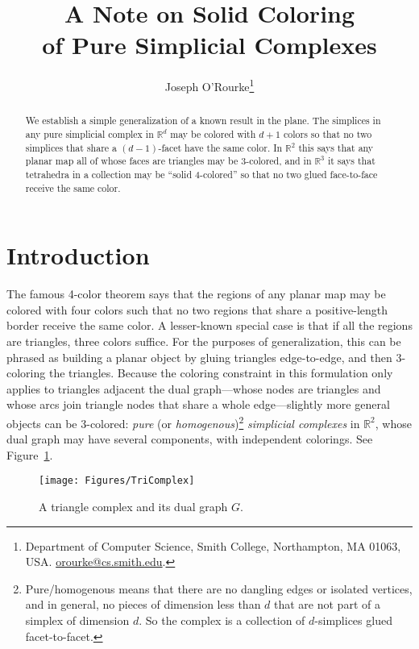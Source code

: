 \pdfoutput=1  \documentclass[]{article}
\title{A Note on Solid Coloring\\of Pure Simplicial Complexes
}
\author{Joseph O'Rourke\thanks{Department of Computer Science, Smith College, Northampton, MA
      01063, USA.
      \protect\url{orourke@cs.smith.edu}.}
}
\newcommand{\figlab}[1]{\label{fig:#1}}
\newcommand{\seclab}[1]{\label{sec:#1}}
\newcommand{\figref}[1]{\ref{fig:#1}}
\def\R{{\mathbb{R}}}
\begin{document}
\maketitle

\begin{abstract}
We establish a simple generalization of a known result in the plane.
The simplices in any pure simplicial complex in $\R^d$ may be
colored with $d+1$ colors so that no two simplices that share a
$(d{-}1)$-facet
have the same color.
In $\R^2$ this says that any planar map all of whose faces
are triangles may be 3-colored,
and in $\R^3$ it says that tetrahedra in a collection
may be ``solid 4-colored'' so that no two glued face-to-face receive
the same color.
\end{abstract}

\section{Introduction}
\seclab{Introduction}
The famous 4-color theorem says that the regions of any planar map
may be colored with four colors such that no two regions that share a
positive-length border receive the same color.
A lesser-known special case is that if all the regions are triangles,
three colors suffice.
For the purposes of generalization, this can be phrased as building a
planar
object by gluing triangles edge-to-edge, and then 3-coloring the
triangles.
Because the coloring constraint in this formulation
only applies to triangles adjacent the
dual
graph---whose nodes are triangles and whose arcs join triangle nodes
that share a whole edge---slightly more general objects can be 3-colored:
\emph{pure} (or \emph{homogenous})\footnote{
  Pure/homogenous means that there are no dangling edges or isolated
  vertices, and in general, no pieces of dimension less than $d$ that
  are not part of a simplex of dimension $d$.  So the complex is a
  collection of $d$-simplices glued facet-to-facet.
}
\emph{simplicial complexes}
in $\R^2$, whose dual graph may have several components, with
independent colorings. 
See Figure~\figref{TriComplex}.
\begin{figure}[htbp]
\centering
\texttt{[image: Figures/TriComplex]}
\caption{A triangle complex and its dual graph $G$.}
\figlab{TriComplex}
\end{figure}
\end{document}
